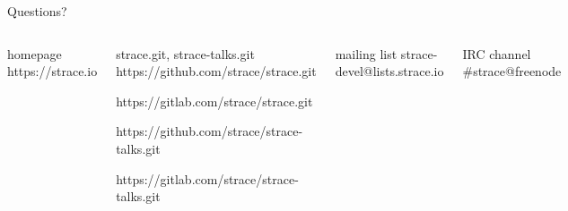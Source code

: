 \documentclass[unicode,aspectratio=169,xcolor={table,dvipsnames,usernames}]{beamer}
\begin{document}
{
\begin{frame}[noframenumbering]{Questions?}
	\begin{columns}
		\column{7cm}
\begin{block}{\large homepage}
	https://strace.io
\end{block}
\begin{block}{\large strace.git, strace-talks.git}
	https://github.com/strace/strace.git

	https://gitlab.com/strace/strace.git

\smallskip

	https://github.com/strace/strace-talks.git

	https://gitlab.com/strace/strace-talks.git
\end{block}
\begin{block}{\large mailing list}
	strace-devel@lists.strace.io
\end{block}
\begin{block}{\large IRC channel}
	\#strace@freenode
\end{block}
		\column{3cm}
			\centerline{}
	\end{columns}
\end{frame}
}
\end{document}
